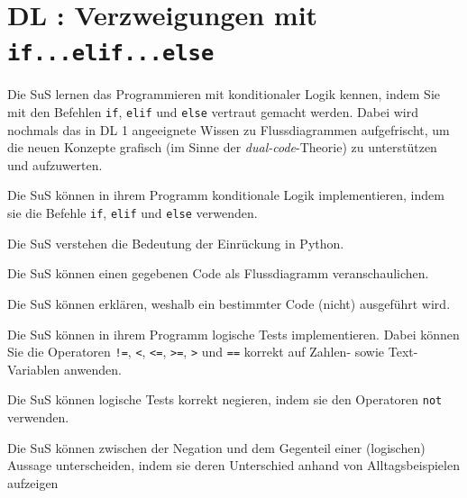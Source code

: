 \section{DL \themycounter: Verzweigungen mit \texorpdfstring{\lstinline|if...elif...else|}{if...elif...else}}
\begin{myExBox}[title=DL \themycounter]
Die SuS lernen das Programmieren mit konditionaler Logik kennen, indem Sie mit den Befehlen \lstinline|if|, \lstinline|elif| und \lstinline|else| vertraut gemacht werden. Dabei wird nochmals das in DL 1 angeeignete Wissen zu Flussdiagrammen aufgefrischt, um die neuen Konzepte grafisch (im Sinne der \textit{dual-code}-Theorie) zu unterstützen und aufzuwerten.

\begin{todolist}
    \item Die SuS können in ihrem Programm konditionale Logik implementieren, indem sie die Befehle \lstinline|if|, \lstinline|elif| und \lstinline|else| verwenden.
    \item Die SuS verstehen die Bedeutung der Einrückung in Python.
    \item Die SuS können einen gegebenen Code als Flussdiagramm veranschaulichen.
    \item Die SuS können erklären, weshalb ein bestimmter Code (nicht) ausgeführt wird.
    \item Die SuS können in ihrem Programm logische Tests implementieren. Dabei können Sie die Operatoren \lstinline|!=|, \lstinline|<|, \lstinline|<=|, \lstinline|>=|, \lstinline|>| und \lstinline|==| korrekt auf Zahlen- sowie Text-Variablen anwenden.
    \item Die SuS können logische Tests korrekt negieren, indem sie den Operatoren \lstinline|not| verwenden.
    \item Die SuS können zwischen der Negation und dem Gegenteil einer (logischen) Aussage unterscheiden, indem sie deren Unterschied anhand von Alltagsbeispielen aufzeigen
\end{todolist}


\end{myExBox}
